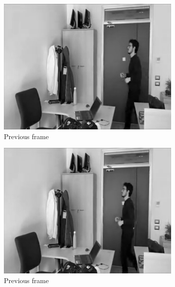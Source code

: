 \begin{figure}[htbp]
    \begin{subfigure}[b]{0.3\textwidth}
        \centering
        \includegraphics[width=1\textwidth]{../assets/images/04-prev-frame.png}
        \caption{Previous frame}
        \label{fig:prev-frame}
    \end{subfigure}
    \hfill
    \begin{subfigure}[b]{0.3\textwidth}
        \includegraphics[width=1\textwidth]{../assets/images/04-curr-frame.png}
        \caption{Previous frame}
        \label{fig:curr-frame}
    \end{subfigure}
    \hfill
    \begin{subfigure}[b]{0.3\textwidth}

\end{subfigure}
\end{figure}
